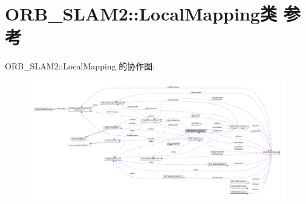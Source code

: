 \hypertarget{classORB__SLAM2_1_1LocalMapping}{\section{O\-R\-B\-\_\-\-S\-L\-A\-M2\-:\-:Local\-Mapping类 参考}
\label{classORB__SLAM2_1_1LocalMapping}
}


O\-R\-B\-\_\-\-S\-L\-A\-M2\-:\-:Local\-Mapping 的协作图\-:
\nopagebreak
\begin{figure}[H]
\begin{center}
\leavevmode
\includegraphics[width=350pt]{classORB__SLAM2_1_1LocalMapping__coll__graph}
\end{center}
\end{figure}
